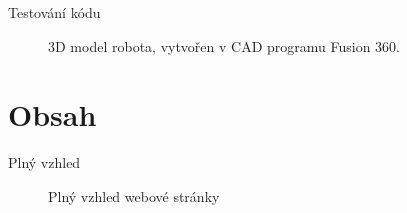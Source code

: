 \documentclass[14pt, hyperref={unicode}]{beamer}
\begin{document}
  \begin{frame}[fragile]{Testování kódu}
    \begin{figure}[H]
      \centering

      \hfill

      \caption[3D model robota]{3D model robota, vytvořen v CAD programu Fusion 360.}%
    \end{figure}
  \end{frame}

  \section{Obsah}

  \begin{frame}{Plný vzhled}
    \begin{figure}[H]
      \caption{Plný vzhled webové stránky}
    \end{figure}
  \end{frame}
\end{document}
